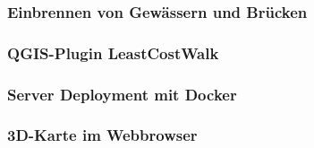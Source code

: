 \subsubsection{Einbrennen von Gewässern und Brücken}

\subsubsection{QGIS-Plugin LeastCostWalk}

\subsubsection{Server Deployment mit Docker}

\subsubsection{3D-Karte im Webbrowser}